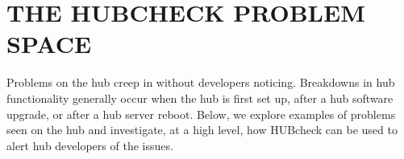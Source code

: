 %
%
%

\chapter{THE HUBCHECK PROBLEM SPACE}
\label{chap:problem}









Problems on the hub creep in without developers noticing. Breakdowns in hub
functionality generally occur when the hub is first set up, after a hub
software upgrade, or after a hub server reboot.  Below, we explore examples of
problems seen on the hub and investigate, at a high level, how HUBcheck can be
used to alert hub developers of the issues.


